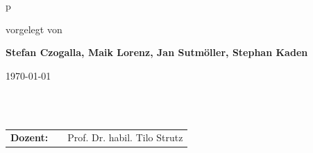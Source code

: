 \begin{center}
\begin{tabular}{p{\textwidth}}
\begin{center}
vorgelegt von
\end{center}

\begin{center}
\large{\textbf{Stefan Czogalla, Maik Lorenz, Jan Sutmöller, Stephan Kaden}} \\
\small{}
\end{center}

\begin{center}
\large{\today}
\end{center}

\\

\\

\begin{center}
\begin{tabular}{lll}
\textbf{Dozent:} & & Prof. Dr. habil. Tilo Strutz\\
\end{tabular}


\end{center}

\end{tabular}
\end{center}